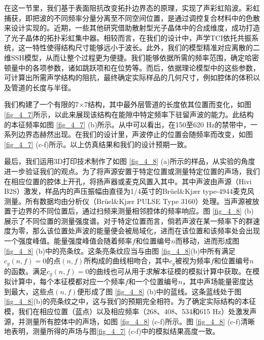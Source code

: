 在这一节里，我们基于表面阻抗改变拓扑边界态的原理，实现了声彩虹陷波。彩虹捕获，即把波的不同频率分量分离至不同空间位置，是通过调控复合材料中的色散来设计实现的。近期，一些其他研究借助散射型光子晶体中的合成维度，成功打造了光子晶体的拓扑彩虹集中器\cite{C44-3}。相较而言，在我们的设计中，声学TCI依托共振系统，这一特性使得结构尺寸能够远小于波长。此外，我们的模型精准对应离散的二维SSH模型，从而让整个过程更为便捷。我们能够依据所需的频率范围，确定哈密顿量中的各项参数，诸如跳跃项和在位势等。而后，依据理论模型中的这些参数，可计算出所需声学结构的阻抗，最终确定实际样品的几何尺寸，例如腔体的体积以及管道的长度与半径。

我们构建了一个有限的7×7结构，其中最外层管道的长度依其位置而变化，如图 \ref{fig_4_7}所示，以此来展现该结构在能隙中特定频率下驻留声波的能力。此结构的本征频率如图 \ref{fig_4_7} (b)所示。从中可以看出，在150至620 Hz的禁带中，一系列边界态赫然出现。在我们的设计里，声波停止的位置会随频率而改变，如图 \ref{fig_4_7} (c-f)所示。以上仿真结果和我们的设计预期一致。

最后，我们运用3D打印技术制作了如图 \ref{fig_4_8} (a)所示的样品，从实验的角度进一步验证我们的观点。为了将声源安置于特定位置或测量特定位置的声场，我们在相应位置的腔体上开孔，将扬声器或麦克风置入其中。其中声波由声源（Hivi B2S）激发，样品内的声压振幅由直径为1/4英寸的Brüel\&Kjær type-4944麦克风测量。所有数据均由分析仪（Brüel\&Kjær PULSE Type 3160）处理。当声源被放置于边界的不同位置后，通过扫频来测量相邻腔体的频率响应。图 \ref{fig_4_8} (b)展示了不同位置的测量强度谱。对于特定位置而言，倘若声波在某一频率下的群速度为零，那么该位置处声波的能量便会被局域化，进而在该位置和该频率处会出现一个强度峰值。能量强度峰值会随着频率$f$和位置编号$n$而移动，进而形成图 \ref{fig_4_8} (b)中的亮条纹。这条亮条纹应当与由图 \ref{fig_4_8}(b)中所有满足$c_g(n,f)=0$的点$(n,f)$所构成的曲线相吻合，其中$c_g$被视为频率$f$和位置编号$n$的函数。满足$c_g(n,f)=0$的曲线也可从用于求解本征模的模拟计算中获取。在模拟计算中，每个本征模都对应一个频率$f$和一个位置编号$n$，其中声场能量密度达到最大，这些点$(n,f)$便形成了图 \ref{fig_4_8} (b)中的蓝线。这条蓝线处于图 \ref{fig_4_8}(b)的亮条纹之中，这与我们的预期完全相符。为了确定实际结构的本征模，我们在相应位置（蓝点）以及相应频率（268、408、534和615 Hz）处激发声源，并测量所有腔体中的声场，如图 \ref{fig_4_8} (c-f)所示。图 \ref{fig_4_8} (c-f)清晰地表明，测量所得的声场与图\ref{fig_4_7} (c-f)中的模拟结果高度一致。

